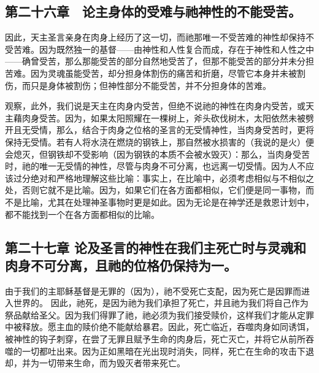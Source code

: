 
\subsection{第二十六章　论主身体的受难与祂神性的不能受苦。}

因此，天主圣言亲身在肉身上经历了这一切，而祂那唯一不受苦难的神性却保持不受苦难。因为既然独一的基督——由神性和人性复合而成，存在于神性和人性之中——确曾受苦，那么那能受苦的部分自然地受苦了，但那不能受苦的部分并未分担苦难。因为灵魂虽能受苦，却分担身体割伤的痛苦和折磨，尽管它本身并未被割伤，而只是身体被割伤；但神性部分不能受苦，并不分担身体的苦难。\par

观察，此外，我们说是天主在肉身内受苦，但绝不说祂的神性在肉身内受苦，或天主藉肉身受苦。因为，如果太阳照耀在一棵树上，斧头砍伐树木，太阳依然未被劈开且无受情，那么，结合于肉身之位格的圣言的无受情神性，当肉身受苦时，更将保持无受情。若有人将水浇在燃烧的钢铁上，那自然被水损害的（我说的是火）便会熄灭，但钢铁却不受影响（因为钢铁的本质不会被水毁灭）：那么，当肉身受苦时，祂的唯一无受情的神性，尽管与肉身不可分离，也远离一切受情。因为人不应该过分绝对和严格地理解这些比喻：事实上，在比喻中，必须考虑相似与不相似之处，否则它就不是比喻。因为，如果它们在各方面都相似，它们便是同一事物，而不是比喻，尤其在处理神圣事物时更是如此。因为无论是在神学还是救恩计划中，都不能找到一个在各方面都相似的比喻。\par


\subsection{第二十七章 论及圣言的神性在我们主死亡时与灵魂和肉身不可分离，且祂的位格仍保持为一。}

由于我们的主耶稣基督是无罪的（因为），祂不受死亡支配，因为死亡是因罪而进入世界的。 因此，祂死，是因为祂为我们承担了死亡，并且祂为我们将自己作为祭品献给圣父。因为我们得罪了祂，祂必须为我们接受赎价，这样我们才能从定罪中被释放。愿主血的赎价绝不能献给暴君。因此，死亡临近，吞噬肉身如同诱饵，被神性的钩子刺穿，在尝了无罪且赋予生命的肉身后，死亡灭亡，并将它从前所吞噬的一切都吐出来。因为正如黑暗在光出现时消失，同样，死亡在生命的攻击下退却，并为一切带来生命，而为毁灭者带来死亡。\par

